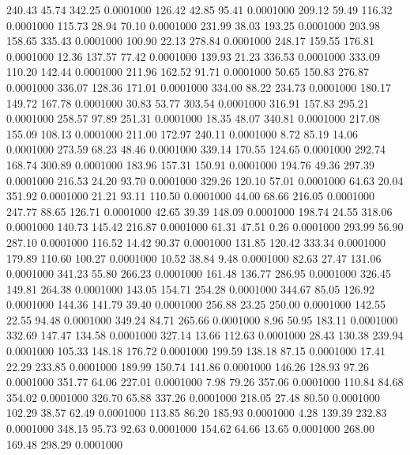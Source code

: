  240.43   45.74  342.25   0.0001000
 126.42   42.85   95.41   0.0001000
 209.12   59.49  116.32   0.0001000
 115.73   28.94   70.10   0.0001000
 231.99   38.03  193.25   0.0001000
 203.98  158.65  335.43   0.0001000
 100.90   22.13  278.84   0.0001000
 248.17  159.55  176.81   0.0001000
  12.36  137.57   77.42   0.0001000
 139.93   21.23  336.53   0.0001000
 333.09  110.20  142.44   0.0001000
 211.96  162.52   91.71   0.0001000
  50.65  150.83  276.87   0.0001000
 336.07  128.36  171.01   0.0001000
 334.00   88.22  234.73   0.0001000
 180.17  149.72  167.78   0.0001000
  30.83   53.77  303.54   0.0001000
 316.91  157.83  295.21   0.0001000
 258.57   97.89  251.31   0.0001000
  18.35   48.07  340.81   0.0001000
 217.08  155.09  108.13   0.0001000
 211.00  172.97  240.11   0.0001000
   8.72   85.19   14.06   0.0001000
 273.59   68.23   48.46   0.0001000
 339.14  170.55  124.65   0.0001000
 292.74  168.74  300.89   0.0001000
 183.96  157.31  150.91   0.0001000
 194.76   49.36  297.39   0.0001000
 216.53   24.20   93.70   0.0001000
 329.26  120.10   57.01   0.0001000
  64.63   20.04  351.92   0.0001000
  21.21   93.11  110.50   0.0001000
  44.00   68.66  216.05   0.0001000
 247.77   88.65  126.71   0.0001000
  42.65   39.39  148.09   0.0001000
 198.74   24.55  318.06   0.0001000
 140.73  145.42  216.87   0.0001000
  61.31   47.51    0.26   0.0001000
 293.99   56.90  287.10   0.0001000
 116.52   14.42   90.37   0.0001000
 131.85  120.42  333.34   0.0001000
 179.89  110.60  100.27   0.0001000
  10.52   38.84    9.48   0.0001000
  82.63   27.47  131.06   0.0001000
 341.23   55.80  266.23   0.0001000
 161.48  136.77  286.95   0.0001000
 326.45  149.81  264.38   0.0001000
 143.05  154.71  254.28   0.0001000
 344.67   85.05  126.92   0.0001000
 144.36  141.79   39.40   0.0001000
 256.88   23.25  250.00   0.0001000
 142.55   22.55   94.48   0.0001000
 349.24   84.71  265.66   0.0001000
   8.96   50.95  183.11   0.0001000
 332.69  147.47  134.58   0.0001000
 327.14   13.66  112.63   0.0001000
  28.43  130.38  239.94   0.0001000
 105.33  148.18  176.72   0.0001000
 199.59  138.18   87.15   0.0001000
  17.41   22.29  233.85   0.0001000
 189.99  150.74  141.86   0.0001000
 146.26  128.93   97.26   0.0001000
 351.77   64.06  227.01   0.0001000
   7.98   79.26  357.06   0.0001000
 110.84   84.68  354.02   0.0001000
 326.70   65.88  337.26   0.0001000
 218.05   27.48   80.50   0.0001000
 102.29   38.57   62.49   0.0001000
 113.85   86.20  185.93   0.0001000
   4.28  139.39  232.83   0.0001000
 348.15   95.73   92.63   0.0001000
 154.62   64.66   13.65   0.0001000
 268.00  169.48  298.29   0.0001000
